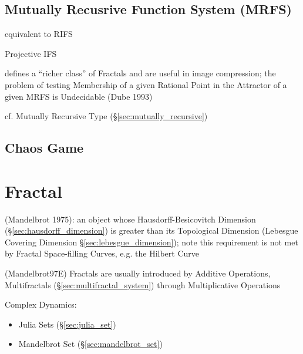 \subsection{Mutually Recusrive Function System (MRFS)}\label{sec:mrfs}

equivalent to RIFS

Projective IFS

defines a ``richer class'' of Fractals and are useful in image compression; the
problem of testing Membership of a given Rational Point in the Attractor of a
given MRFS is Undecidable (Dube 1993)

cf. Mutually Recursive Type (\S\ref{sec:mutually_recursive})



\subsection{Chaos Game}\label{sec:chaos_game}



\section{Fractal}\label{sec:fractal}

(Mandelbrot 1975): an object whose Hausdorff-Besicovitch Dimension
(\S\ref{sec:hausdorff_dimension}) is greater than its Topological Dimension
(Lebesgue Covering Dimension \S\ref{sec:lebesgue_dimension}); note this
requirement is not met by Fractal Space-filling Curves, e.g. the Hilbert Curve

(Mandelbrot97E) Fractals are usually introduced by Additive Operations,
Multifractals (\S\ref{sec:multifractal_system}) through Multiplicative
Operations

Complex Dynamics:
\begin{itemize}
  \item Julia Sets (\S\ref{sec:julia_set})
  \item Mandelbrot Set (\S\ref{sec:mandelbrot_set})
\end{itemize}

